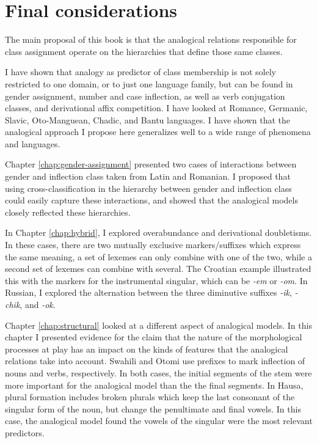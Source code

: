 \section{Final considerations}

The main proposal of this book is that the analogical relations responsible for class assignment operate on the hierarchies that define those same classes.

I have shown that analogy as predictor of  class membership is not solely restricted to one domain, or to just one language family, but can be found in gender assignment, number and case inflection, as well as verb conjugation classes, and derivational affix competition.
I have looked at Romance, Germanic, Slavic, Oto-Manguean, Chadic, and Bantu languages. I have shown that the analogical approach I propose here generalizes well to a wide range of phenomena and languages.

Chapter \ref{chap:gender-assignment} presented two cases of interactions between gender and inflection class taken from Latin and Romanian.
I proposed that using cross-classification in the hierarchy between gender and inflection class could easily capture these interactions, and showed that the analogical models closely reflected these hierarchies.

In Chapter \ref{chap:hybrid}, I explored overabundance and derivational doubletisms.
In these cases, there are two mutually exclusive markers/suffixes which express the same meaning, a set of lexemes can only combine with one of the two, while a second set of lexemes can combine with several.
The Croatian example illustrated this with the markers for the instrumental singular, which can be \textit{-em} or \textit{-om}.
In Russian, I explored the alternation between the three diminutive suffixes \textit{-ik}, \textit{-chik}, and \textit{-ok}.

Chapter \ref{chap:structural} looked at a different aspect of analogical models. In this chapter I presented evidence for the claim that the nature of the morphological processes at play has an impact on the kinds of features that the analogical relations take into account.
Swahili and Otomi use prefixes to mark inflection of nouns and verbs, respectively.
In both cases, the initial segments of the stem were more important for the analogical model than the the final segments.
In Hausa, plural formation includes broken plurals which keep the last consonant of the singular form of the noun, but change the penultimate and final vowels.
In this case, the analogical model found the vowels of the singular were the most relevant predictors.

